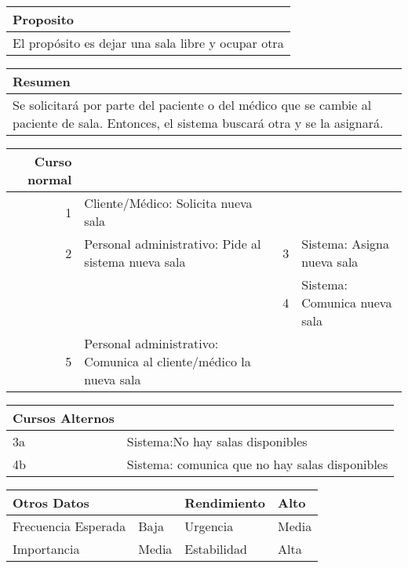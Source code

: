 \documentclass[10pt,a4paper,spanish]{report}
\begin{document}
\begin{center}
\begin{tabular}{l}
\hline
Proposito\\
\hline
El propósito es dejar una sala libre y ocupar otra\\
\hline
\end{tabular}
\end{center}


\begin{center}
\begin{tabular}{l}
\hline
Resumen\\
\hline
Se solicitará por parte del paciente o del médico que se cambie al paciente de sala. Entonces, el sistema buscará otra y se la asignará.\\
\hline
\end{tabular}
\end{center}

\begin{center}
\begin{tabular}{rlrl}
\hline
Curso normal &  &  & \\
\hline
1 & Cliente/Médico: Solicita nueva sala &  & \\
\hline
2 & Personal administrativo: Pide al sistema nueva sala & 3 & Sistema: Asigna nueva sala\\
\hline
 &  & 4 & Sistema: Comunica nueva sala\\
\hline
5 & Personal administrativo: Comunica al cliente/médico la nueva sala &  & \\
\hline
\end{tabular}
\end{center}



\begin{center}
\begin{tabular}{ll}
\hline
Cursos Alternos & \\
\hline
3a & Sistema:No hay salas disponibles\\
\hline
4b & Sistema: comunica que no hay salas disponibles\\
\hline
\end{tabular}
\end{center}


\begin{center}
\begin{tabular}{llll}
\hline
Otros Datos &  & Rendimiento & Alto\\
\hline
Frecuencia Esperada & Baja & Urgencia & Media\\
\hline
Importancia & Media & Estabilidad & Alta\\
\hline
\end{tabular}
\end{center}
\end{document}
